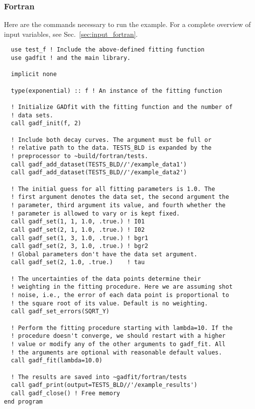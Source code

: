 \documentclass{article}
\begin{document}
\subsubsection{Fortran}

Here are the commands necessary to run the example. For a complete overview of input variables, see Sec.~\ref{sec:input_fortran}.
\begin{verbatim}
  use test_f ! Include the above-defined fitting function
  use gadfit ! and the main library.

  implicit none

  type(exponential) :: f ! An instance of the fitting function

  ! Initialize GADfit with the fitting function and the number of
  ! data sets.
  call gadf_init(f, 2)

  ! Include both decay curves. The argument must be full or
  ! relative path to the data. TESTS_BLD is expanded by the
  ! preprocessor to ~build/fortran/tests.
  call gadf_add_dataset(TESTS_BLD//'/example_data1')
  call gadf_add_dataset(TESTS_BLD//'/example_data2')

  ! The initial guess for all fitting parameters is 1.0. The
  ! first argument denotes the data set, the second argument the
  ! parameter, third argument its value, and fourth whether the
  ! parameter is allowed to vary or is kept fixed.
  call gadf_set(1, 1, 1.0, .true.) ! I01
  call gadf_set(2, 1, 1.0, .true.) ! I02
  call gadf_set(1, 3, 1.0, .true.) ! bgr1
  call gadf_set(2, 3, 1.0, .true.) ! bgr2
  ! Global parameters don't have the data set argument.
  call gadf_set(2, 1.0, .true.)    ! tau

  ! The uncertainties of the data points determine their
  ! weighting in the fitting procedure. Here we are assuming shot
  ! noise, i.e., the error of each data point is proportional to
  ! the square root of its value. Default is no weighting.
  call gadf_set_errors(SQRT_Y)

  ! Perform the fitting procedure starting with lambda=10. If the
  ! procedure doesn't converge, we should restart with a higher
  ! value or modify any of the other arguments to gadf_fit. All
  ! the arguments are optional with reasonable default values.
  call gadf_fit(lambda=10.0)

  ! The results are saved into ~gadfit/fortran/tests
  call gadf_print(output=TESTS_BLD//'/example_results')
  call gadf_close() ! Free memory
end program
\end{verbatim}
\end{document}
